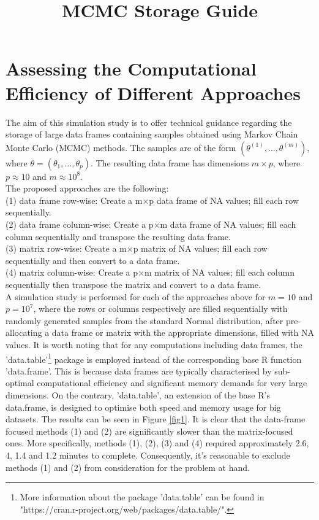 \documentclass[a4paper]{article}
\author{}
\date{}
\title{MCMC Storage Guide \vspace{-5em}}
\begin{document}
\maketitle
\section*{\centering\textnormal{Assessing the Computational Efficiency of Different Approaches}}
\noindent The aim of this simulation study is to offer technical guidance regarding the storage of large data frames containing samples obtained using Markov Chain Monte Carlo (MCMC) methods. The samples are of the form $(\theta^{(1)}, \dots, \theta^{(m)})$, where $\theta = (\theta_1, \dots, \theta_p)$. The resulting data frame has dimensions $m \times p$, where $p \approx 10$ and $m \approx 10^8$. \\

\noindent The proposed approaches are the following: \\
(1) data frame row-wise: Create a m$\times$p data frame of NA values; fill each row sequentially.\\
(2) data frame column-wise: Create a p$\times$m data frame of NA values; fill each column
sequentially and transpose the resulting data frame.\\
(3) matrix row-wise: Create a m$\times$p matrix of NA values; fill each row sequentially and
then convert to a data frame.\\
(4) matrix column-wise: Create a p$\times$m matrix of NA values; fill each column sequentially
then transpose the matrix and convert to a data frame.\\

\noindent A simulation study is performed for each of the approaches above for $m = 10$ and $p = 10^7$, where the rows or columns respectively are filled sequentially with randomly generated samples from the standard Normal distribution, after pre-allocating a data frame or matrix with the appropriate dimensions, filled with NA values. It is worth noting that for any computations including data frames, the 'data.table'\footnote{More information about the package 'data.table' can be found in "https://cran.r-project.org/web/packages/data.table/".} package is employed instead of the corresponding base R function 'data.frame'. This is because data frames are typically characterised by sub-optimal computational efficiency and significant memory demands for very large dimensions. On the contrary, 'data.table', an extension of the base R's data.frame, is designed to optimise both speed and memory usage for big datasets. The results can be seen in Figure \ref{fig1}. It is clear that the data-frame focused methods (1) and (2) are significantly slower than the matrix-focused ones. More specifically, methods (1), (2), (3) and (4) required approximately 2.6, 4, 1.4 and 1.2 minutes to complete. Consequently, it's reasonable to exclude methods (1) and (2) from consideration for the problem at hand.\\
\end{document}
